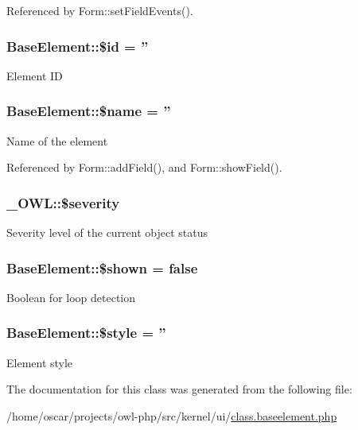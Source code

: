 Referenced by Form::setFieldEvents().

\subsubsection[{\$id}]{\setlength{\rightskip}{0pt plus 5cm}BaseElement::\$id = ''}\label{classBaseElement_a11b6989c43b53869a09f5ce65aa55b45}
Element ID 
\subsubsection[{\$name}]{\setlength{\rightskip}{0pt plus 5cm}BaseElement::\$name = ''}\label{classBaseElement_a30b8cff187a9de659a70daf287d66f45}
Name of the element 

Referenced by Form::addField(), and Form::showField().

\subsubsection[{\$severity}]{\setlength{\rightskip}{0pt plus 5cm}\_\-OWL::\$severity}\label{class__OWL_ad26b40a9dbbacb33e299b17826f8327c}
Severity level of the current object status 
\subsubsection[{\$shown}]{\setlength{\rightskip}{0pt plus 5cm}BaseElement::\$shown = false}\label{classBaseElement_ae435cc6d7b4aa9824322ef40ad7450f6}
Boolean for loop detection 
\subsubsection[{\$style}]{\setlength{\rightskip}{0pt plus 5cm}BaseElement::\$style = ''}\label{classBaseElement_a429a3d642dd95f30e1059ef29564b87d}
Element style 

The documentation for this class was generated from the following file:\begin{DoxyCompactItemize}
\item 
/home/oscar/projects/owl-\/php/src/kernel/ui/\hyperlink{class_8baseelement_8php}{class.baseelement.php}\end{DoxyCompactItemize}
